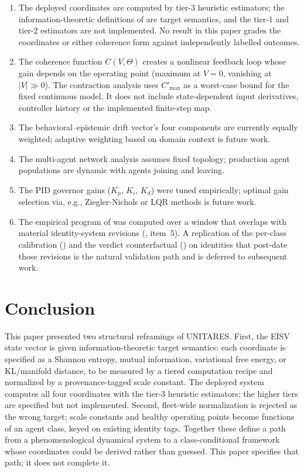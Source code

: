 \documentclass[11pt,twocolumn]{article}
\newcommand{\cv}{\ensuremath{C(V,\Theta)}}
\begin{document}
\begin{enumerate}
\item The deployed coordinates are computed by tier-3 heuristic
  estimators; the information-theoretic definitions of
   are target semantics, and the tier-1 and
  tier-2 estimators are not implemented. No result in this paper
  grades the coordinates or either coherence form against
  independently labelled outcomes.
\item The coherence function $\cv$ creates a nonlinear feedback
  loop whose gain depends on the operating point (maximum at
  $V = 0$, vanishing at $|V| \gg 0$). The contraction analysis
  uses $C'_{\max}$ as a worst-case bound for the fixed continuous
  model. It does not include state-dependent input derivatives,
  controller history or the implemented finite-step map.
\item The behavioral--epistemic drift vector's four components are currently
  equally weighted; adaptive weighting based on domain context
  is future work.
\item The multi-agent network analysis assumes fixed topology;
  production agent populations are dynamic with agents joining
  and leaving.
\item The PID governor gains ($K_p$, $K_i$, $K_d$) were tuned
  empirically; optimal gain selection via, e.g., Ziegler-Nichols
  or LQR methods is future work.
\item The empirical program of  was computed
  over a window that overlaps with material identity-system revisions
  (, item~5). A replication of the per-class
  calibration () and the verdict
  counterfactual () on identities
  that post-date those revisions is the natural validation path and
  is deferred to subsequent work.
\end{enumerate}

\section{Conclusion}
\label{sec:conclusion}

This paper presented two structural reframings of UNITARES.
First, the EISV state vector is given information-theoretic
target semantics: each coordinate is specified as a Shannon
entropy, mutual information, variational free energy, or
KL/manifold distance, to be measured by a tiered computation
recipe and normalized by a provenance-tagged scale constant. The
deployed system computes all four coordinates with the tier-3
heuristic estimators; the higher tiers are specified but not
implemented. Second, fleet-wide normalization is rejected as the
wrong target; scale constants and healthy operating points become
functions of an agent class, keyed on existing identity tags.
Together these define a path from a phenomenological dynamical
system to a class-conditional framework whose coordinates could be
derived rather than guessed. This paper specifies that path; it
does not complete it.
\end{document}
